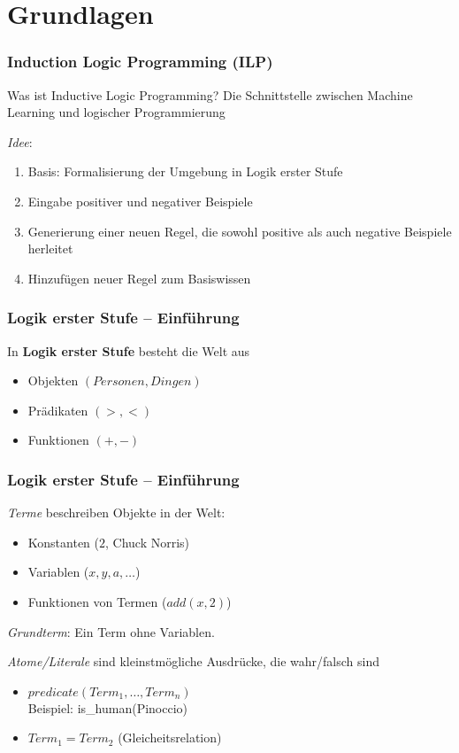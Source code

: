 \section{Grundlagen}

\begin{frame}
	\frametitle{Induction Logic Programming (ILP)}

	\begin{block}{Was ist Inductive Logic Programming?}
			Die Schnittstelle zwischen Machine Learning und logischer Programmierung
	\end{block}

	\vspace{5pt}
	\emph{Idee}:
		\begin{enumerate}
			\item Basis: Formalisierung der Umgebung in Logik erster Stufe
			\item Eingabe positiver und negativer Beispiele
			\item Generierung einer neuen Regel, die sowohl positive
				als auch negative Beispiele herleitet
			\item Hinzufügen neuer Regel zum Basiswissen
		\end{enumerate}
\end{frame}

\begin{frame}
	\frametitle{Logik erster Stufe -- Einführung}

	In \textbf{Logik erster Stufe} besteht die Welt aus
	\begin{itemize}
		\item Objekten  $(Personen, Dingen)$
		\item Prädikaten $(>, <)$
		\item Funktionen $(+, -)$
	\end{itemize}
\end{frame}

\begin{frame}
	\frametitle{Logik erster Stufe -- Einführung}
	\emph{Terme} beschreiben Objekte in der Welt:\\
	\begin{itemize}
		\item Konstanten  ($2$, Chuck Norris)
		\item Variablen   ($x,y, a, \ldots$)
		\item Funktionen von Termen ($add(x,2)$)
	\end{itemize}

	\emph{Grundterm}: Ein Term ohne Variablen.
	\pause

	\vspace{15pt}
	\emph{Atome/Literale} sind kleinstmögliche Ausdrücke, die wahr/falsch sind
	\begin{itemize}
		\item $predicate(Term_1, \ldots, Term_n)$\\ 
			Beispiel: is\_human(Pinoccio)
		\item $Term_1 = Term_2$ (Gleicheitsrelation)
	\end{itemize}

\end{frame}

